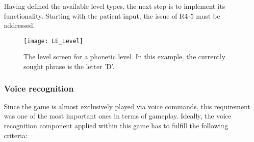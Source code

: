 \documentclass[draft,final]{vutinfth} %
\begin{document}
Having defined the available level types, the next step is to implement its functionality. Starting with the patient input, the issue of R4-5 must be addressed.

\begin{figure}
\begin{center}
\texttt{[image: LE\_Level]}
\end{center}
\caption{The level screen for a phonetic level. In this example, the currently sought phrase is the letter 'D'.}
\label{fig:UseCase}
\end{figure}
\subsubsection{Voice recognition}
Since the game is almost exclusively played via voice commands, this requirement was one of the most important ones in terms of gameplay. Ideally, the voice recognition component applied within this game has to fulfill the following criteria:
\end{document}
